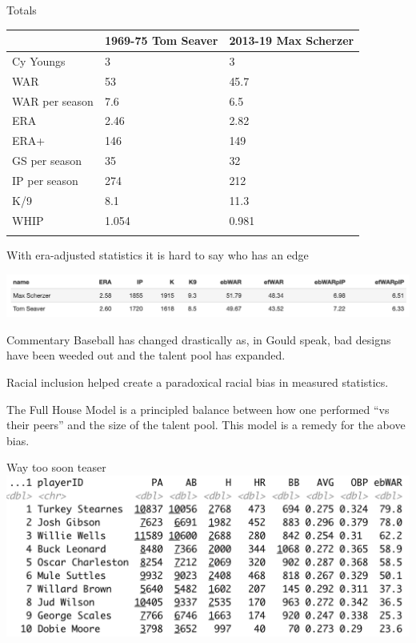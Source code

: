 \documentclass[
  ignorenonframetext,
]{beamer}
\begin{document}
\begin{frame}{Totals}
\protect\hypertarget{totals}{}
\begin{longtable}[]{@{}lll@{}}
\toprule\noalign{}
& 1969-75 Tom Seaver & 2013-19 Max Scherzer \\
\midrule\noalign{}
\endhead
Cy Youngs & 3 & 3 \\
WAR & 53 & 45.7 \\
WAR per season & 7.6 & 6.5 \\
ERA & 2.46 & 2.82 \\
ERA+ & 146 & 149 \\
GS per season & 35 & 32 \\
IP per season & 274 & 212 \\
K/9 & 8.1 & 11.3 \\
WHIP & 1.054 & 0.981 \\
\bottomrule\noalign{}
\end{longtable}
\end{frame}

\begin{frame}{}
\protect\hypertarget{section-15}{}
With era-adjusted statistics it is hard to say who has an edge

\vspace{12pt}

\includegraphics{SeavervScherzer.png}
\end{frame}

\begin{frame}{Commentary}
\protect\hypertarget{commentary}{}
Baseball has changed drastically as, in Gould speak, bad designs have
been weeded out and the talent pool has expanded.

\vspace{12pt}

Racial inclusion helped create a paradoxical racial bias in measured
statistics.

\vspace{12pt}

The Full House Model is a principled balance between how one performed
``vs their peers'' and the size of the talent pool. This model is a
remedy for the above bias.
\end{frame}

\begin{frame}{Way too soon teaser}
\protect\hypertarget{way-too-soon-teaser}{}
\includegraphics{top10NGL.png}
\end{frame}
\end{document}
